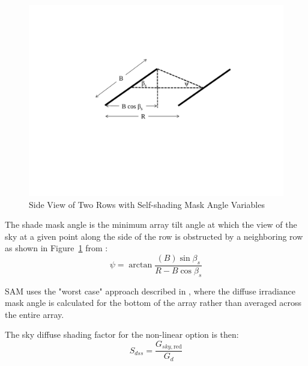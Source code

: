 \documentclass[12pt,letterpaper]{article}
\begin{document}
\begin{figure}
\begin{center}
\includegraphics[scale=0.66]{self-shading-mask-angle}
\caption{Side View of Two Rows with Self-shading Mask Angle Variables}
\label{fig-selfshadingmaskangle}
\end{center}
\end{figure}

The shade mask angle is the minimum array tilt angle at which the view of the sky at a given point along the side of the row is obstructed by a neighboring row as shown in Figure~\ref{fig-selfshadingmaskangle} from \citet{passias1984}:
\begin{equation}
\psi = \arctan \frac{ (B)\sin\beta_s } { R - B\cos\beta_s }
\end{equation}

SAM uses the "worst case" approach described in \citep{deline2013b}, where the diffuse irradiance mask angle is calculated for the bottom of the array rather than averaged across the entire array.

The sky diffuse shading factor for the non-linear option is then:
\begin{equation}
S_{dss} = \frac{G_{sky,\text{red}}}{G_d}
\end{equation}

\end{document}

